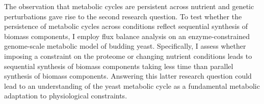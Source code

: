 The observation that metabolic cycles are persistent across nutrient and genetic perturbations gave rise to the second research question.
To test whether the persistence of metabolic cycles across conditions reflect sequential synthesis of biomass components, I employ flux balance analysis on an enzyme-constrained genome-scale metabolic model of budding yeast.
Specifically, I assess whether imposing a constraint on the proteome or changing nutrient conditions leads to sequential synthesis of biomass components taking less time than parallel synthesis of biomass components.
Answering this latter research question could lead to an understanding of the yeast metabolic cycle as a fundamental metabolic adaptation to physiological constraints.

